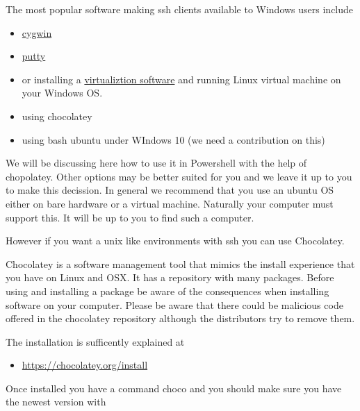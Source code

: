 The most popular software making ssh clients available to Windows
users include
\begin{itemize}
\item {} 
\href{http://cygwin.com/install.html}{cygwin}

\item {} 
\href{http://the.earth.li/~sgtatham/putty/0.62/htmldoc/}{putty}

\item {} 
or installing a \href{http://cygwin.com/install.html}{virtualiztion software} and running Linux virtual
machine on your Windows OS.

\item {} 
using chocolatey

\item {} 
using bash ubuntu under WIndows 10 (we need a contribution on this)

\end{itemize}

We will be discussing here how to use it in Powershell with the help
of chopolatey. Other options may be better suited for you and we leave
it up to you to make this decission. In general we recommend that you
use an ubuntu OS either on bare hardware or a virtual
machine. Naturally your computer must support this. It will be up to
you to find such a computer.

However if you want a unix like environments with ssh you can use
Chocolatey.

Chocolatey is a software management tool that mimics the install
experience that you have on Linux and OSX. It has a repository with
many packages. Before using and installing a package be aware of the
consequences when installing software on your computer. Please be
aware that there could be malicious code offered in the chocolatey
repository although the distributors try to remove them.

The installation is sufficently explained at
\begin{itemize}
\item {} 
\url{https://chocolatey.org/install}

\end{itemize}

Once installed you have a command choco and you should make sure you
have the newest version with

\begin{sphinxVerbatim}[commandchars=\\\{\}]
  
\end{sphinxVerbatim}

